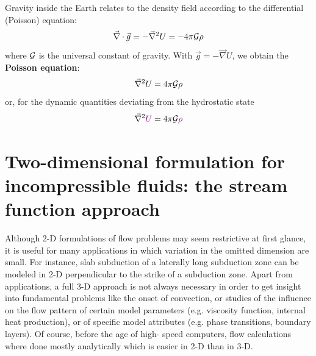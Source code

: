Gravity inside the Earth relates to the density field according to the differential (Poisson) equation:
\begin{equation}
\vec\nabla \cdot \vec{g} = - \vec\nabla^2 U = -4\pi {\cal G} \rho
\end{equation}
where ${\cal G}$ is the universal constant of gravity. With $\vec{g}=-\vec\nabla U$, 
we obtain the {\bf Poisson equation}:
\begin{equation}
\vec\nabla^2 U = 4\pi {\cal G} \rho
\label{eq:md35}
\end{equation}
or, for the dynamic quantities deviating from the hydrostatic state
\begin{equation}
\vec\nabla^2 {\color{violet} U} = 4\pi {\cal G} {\color{violet} \rho}
\label{eq:md36}
\end{equation}


\vspace{0.5cm}
\vspace{0.5cm}

\section{Two-dimensional formulation for incompressible fluids: the stream function approach}

Although 2-D formulations of flow problems may seem restrictive at first glance, it is
useful for many applications in which variation in the omitted dimension are small. For
instance, slab subduction of a laterally long subduction zone can be modeled in 2-D
perpendicular to the strike of a subduction zone. Apart from applications, a full 3-D
approach is not always necessary in order to get insight into fundamental problems like
the onset of convection, or studies of the influence on the flow pattern of certain model
parameters (e.g. viscosity function, internal heat production), or of specific model
attributes (e.g. phase transitions, boundary layers). Of course, before the age of high-
speed computers, flow calculations where done mostly analytically which is easier in 2-D
than in 3-D.

